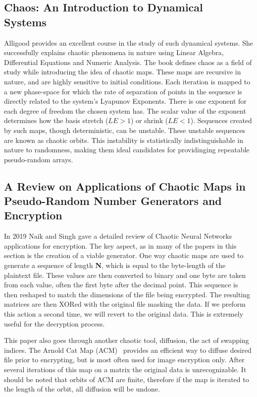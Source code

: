 \subsection{\textbf{Chaos: An Introduction to Dynamical Systems}~\cite{Alligood}}\label{subsec:chaos:-an-introduction-to-dynamical-systems}

Alligood provides an excellent course in the study of such dynamical systems.
She successfully explains chaotic phenomena in nature using Linear Algebra, Differential Equations and Numeric Analysis.
The book defines chaos as a field of study while introducing the idea of chaotic maps.
These maps are recursive in nature, and are highly sensitive to initial conditions.
Each iteration is mapped to a new phase-space for which the rate of separation of points in the sequence is directly related to the system's Lyapunov Exponents.
There is one exponent for each degree of freedom the chosen system has.
The scalar value of the exponent determines how the basis stretch ($LE > 1$) or shrink ($LE < 1$).
Sequences created by such maps, though deterministic, can be unstable.
These unstable sequences are known as chaotic orbits.
This instability is statistically indistinguishable in nature to randomness, making them ideal candidates for providinging repeatable pseudo-random arrays.

\subsection{\textbf{A Review on Applications of Chaotic Maps in Pseudo-Random Number Generators and Encryption}~\cite{Naik2022}}\label{subsec:a-review-on-applications-of-chaotic-maps-in-pseudo-random-number-generators-and-encryption}

In 2019 Naik and Singh gave a detailed review of Chaotic Neural Networks applications for encryption.
The key aspect, as in many of the papers in this section is the creation of a viable generator.
One way chaotic maps are used to generate a sequence of length \textbf{N}, which is equal to the byte-length of the plaintext file.
These values are then converted to binary and one byte are taken from each value, often the first byte after the decimal point.
This sequence is then reshaped to match the dimensions of the file being encrypted.
The resulting matrices are then XORed with the original file masking the data.
If we preform this action a second time, we will revert to the original data.
This is extremely useful for the decryption process.

This paper also goes through another chaotic tool, diffusion, the act of swapping indices.
The Arnold Cat Map (ACM)~\cite{Naik2022} provides an efficient way to diffuse desired file prior to encrypting, but is most often used for image encryption only.
After several iterations of this map on a matrix the original data is unrecognizable.
It should be noted that orbits of ACM are finite, therefore if the map is iterated to the length of the orbit, all diffusion will be undone.

